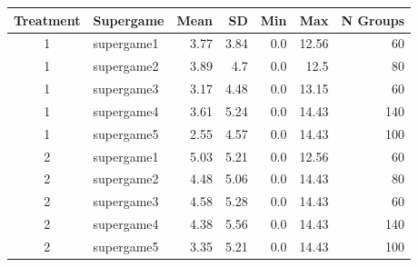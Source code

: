 \begin{tabular}{clrrrrr}
  \toprule
  Treatment & Supergame & Mean & SD & Min & Max & N Groups \\ 
  \midrule
  1 & supergame1 & 3.77 & 3.84 & 0.0 & 12.56 & 60 \\ 
  1 & supergame2 & 3.89 & 4.7 & 0.0 & 12.5 & 80 \\ 
  1 & supergame3 & 3.17 & 4.48 & 0.0 & 13.15 & 60 \\ 
  1 & supergame4 & 3.61 & 5.24 & 0.0 & 14.43 & 140 \\ 
  1 & supergame5 & 2.55 & 4.57 & 0.0 & 14.43 & 100 \\ 
  2 & supergame1 & 5.03 & 5.21 & 0.0 & 12.56 & 60 \\ 
  2 & supergame2 & 4.48 & 5.06 & 0.0 & 14.43 & 80 \\ 
  2 & supergame3 & 4.58 & 5.28 & 0.0 & 14.43 & 60 \\ 
  2 & supergame4 & 4.38 & 5.56 & 0.0 & 14.43 & 140 \\ 
  2 & supergame5 & 3.35 & 5.21 & 0.0 & 14.43 & 100 \\ 
  \bottomrule
\end{tabular}
